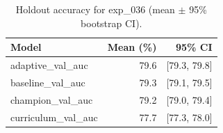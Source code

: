 \begin{table}[ht]
\centering
\caption{Holdout accuracy for exp_036 (mean $\pm$ 95\% bootstrap CI).}
\label{tab:exp_036}
\begin{tabular}{lrr}
\toprule
Model & Mean (\%) & 95\% CI \\
\midrule
adaptive\_val\_auc & 79.6 & [79.3, 79.8] \\
baseline\_val\_auc & 79.3 & [79.1, 79.5] \\
champion\_val\_auc & 79.2 & [79.0, 79.4] \\
curriculum\_val\_auc & 77.7 & [77.3, 78.0] \\
\bottomrule
\end{tabular}
\end{table}
